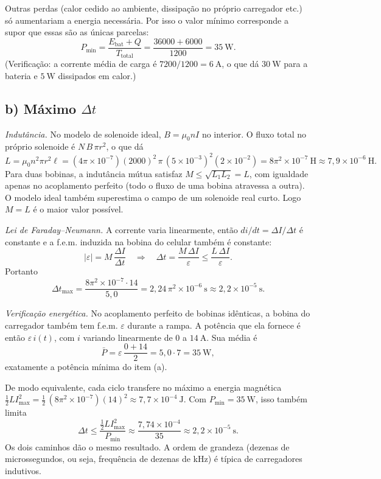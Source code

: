 \documentclass{article}%
\begin{document}
Outras perdas (calor cedido ao ambiente, dissipação no próprio carregador etc.) só aumentariam a energia necessária. Por isso o valor mínimo corresponde a supor que essas são as únicas parcelas:
\[
P_{\min}=\frac{E_{\text{bat}}+Q}{T_{\text{total}}}=\frac{36000+6000}{1200}=35\ \text{W}.
\]
(Verificação: a corrente média de carga é $7200/1200=6\ \text{A}$, o que dá $30\ \text{W}$ para a bateria e $5\ \text{W}$ dissipados em calor.)

\subsection*{b) Máximo $\Delta t$}

\emph{Indutância.} No modelo de solenoide ideal, $B=\mu_0 n I$ no interior. O fluxo total no próprio solenoide é $N\,B\,\pi r^2$, o que dá
\[
L=\mu_0 n^2 \pi r^2 \ell=(4\pi\times10^{-7})(2000)^2\,\pi\,(5\times10^{-3})^2(2\times10^{-2})=8\pi^2\times10^{-7}\ \text{H}\approx 7{,}9\times10^{-6}\ \text{H}.
\]
Para duas bobinas, a indutância mútua satisfaz $M\le\sqrt{L_1L_2}=L$, com igualdade apenas no acoplamento perfeito (todo o fluxo de uma bobina atravessa a outra). O modelo ideal também superestima o campo de um solenoide real curto. Logo $M=L$ é o maior valor possível.

\emph{Lei de Faraday--Neumann.} A corrente varia linearmente, então $di/dt=\Delta I/\Delta t$ é constante e a f.e.m. induzida na bobina do celular também é constante:
\[
|\varepsilon|=M\,\frac{\Delta I}{\Delta t}\quad\Longrightarrow\quad \Delta t=\frac{M\,\Delta I}{\varepsilon}\le\frac{L\,\Delta I}{\varepsilon}.
\]
Portanto
\[
\Delta t_{\max}=\frac{8\pi^2\times10^{-7}\cdot 14}{5{,}0}=2{,}24\,\pi^2\times10^{-6}\ \text{s}\approx 2{,}2\times10^{-5}\ \text{s}.
\]

\emph{Verificação energética.} No acoplamento perfeito de bobinas idênticas, a bobina do carregador também tem f.e.m. $\varepsilon$ durante a rampa. A potência que ela fornece é então $\varepsilon\,i(t)$, com $i$ variando linearmente de $0$ a $14\ \text{A}$. Sua média é
\[
\bar P=\varepsilon\,\frac{0+14}{2}=5{,}0\cdot 7=35\ \text{W},
\]
exatamente a potência mínima do item (a).

De modo equivalente, cada ciclo transfere no máximo a energia magnética $\tfrac12 L I_{\max}^2=\tfrac12\,(8\pi^2\times10^{-7})(14)^2\approx 7{,}7\times10^{-4}\ \text{J}$. Com $P_{\min}=35\ \text{W}$, isso também limita
\[
\Delta t\le\frac{\tfrac12 L I_{\max}^2}{P_{\min}}\approx\frac{7{,}74\times10^{-4}}{35}\approx 2{,}2\times10^{-5}\ \text{s}.
\]
Os dois caminhos dão o mesmo resultado. A ordem de grandeza (dezenas de microssegundos, ou seja, frequência de dezenas de kHz) é típica de carregadores indutivos.
\end{document}
